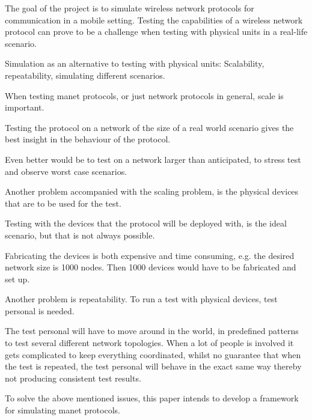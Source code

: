 

The goal of the project is to simulate wireless network protocols for communication in a mobile setting. Testing the capabilities of a wireless network protocol can prove to be a challenge when testing with physical units in a real-life scenario.

Simulation as an alternative to testing with physical units: Scalability, repeatability, simulating different scenarios.

When testing \gls{manet} protocols, or just network protocols in general, scale is important. 

Testing the protocol on a network of the size of a real world scenario gives the best insight in the behaviour of the protocol.

Even better would be to test on a network larger than anticipated, to stress test and observe worst case scenarios.

Another problem accompanied with the scaling problem, is the physical devices that are to be used for the test. 

Testing with the devices that the protocol will be deployed with, is the ideal scenario, but that is not always possible. 

Fabricating the devices is both expensive and time consuming, e.g. the desired network size is 1000 nodes. Then 1000 devices would have to be fabricated and set up.

Another problem is repeatability. To run a test with physical devices, test personal is needed. 

The test personal will have to move around in the world, in predefined patterns to test several different network topologies. 
When a lot of people is involved it gets complicated to keep everything coordinated, whilst no guarantee that when the test is repeated, the test personal will behave in the exact same way thereby not producing consistent test results.\medbreak

To solve the above mentioned issues, this paper intends to develop a framework for simulating \gls{manet} protocols. 

